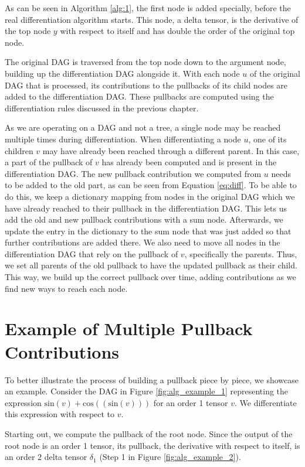 \documentclass[12pt, a4paper]{report}
\begin{document}
As can be seen in Algorithm \ref{alg:1}, the first node is added specially, before the real differentiation algorithm starts.
This node, a delta tensor, is the derivative of the top node $y$ with respect to itself and has double the order of the original top node.

The original DAG is traversed from the top node down to the argument node, building up the differentiation DAG alongside it.
With each node $u$ of the original DAG that is processed, its contributions to the pullbacks of its child nodes are added to the differentiation DAG.
These pullbacks are computed using the differentiation rules discussed in the previous chapter.

As we are operating on a DAG and not a tree, a single node may be reached multiple times during differentiation.
When differentiating a node $u$, one of its children $v$ may have already been reached through a different parent.
In this case, a part of the pullback of $v$ has already been computed and is present in the differentiation DAG.
The new pullback contribution we computed from $u$ needs to be added to the old part, as can be seen from Equation \ref{eq:diff}.
To be able to do this, we keep a dictionary mapping from nodes in the original DAG which we have already reached to their pullback in the differentiation DAG.
This lets us add the old and new pullback contributions with a sum node.
Afterwards, we update the entry in the dictionary to the sum node that was just added so that further contributions are added there.
We also need to move all nodes in the differentiation DAG that rely on the pullback of $v$, specifically the parents.
Thus, we set all parents of the old pullback to have the updated pullback as their child.
This way, we build up the correct pullback over time, adding contributions as we find new ways to reach each node.

\FloatBarrier
\section{Example of Multiple Pullback Contributions}
To better illustrate the process of building a pullback piece by piece, we showcase an example.
Consider the DAG in Figure \ref{fig:alg_example_1} representing the expression $\text{sin}(v) + \text{cos}((\text{sin}(v)))$ for an order 1 tensor $v$.
We differentiate this expression with respect to $v$.

Starting out, we compute the pullback of the root node.
Since the output of the root node is an order 1 tensor, its pullback, the derivative with respect to itself, is an order 2 delta tensor $\delta_1$ (Step 1 in Figure \ref{fig:alg_example_2}).
\end{document}
